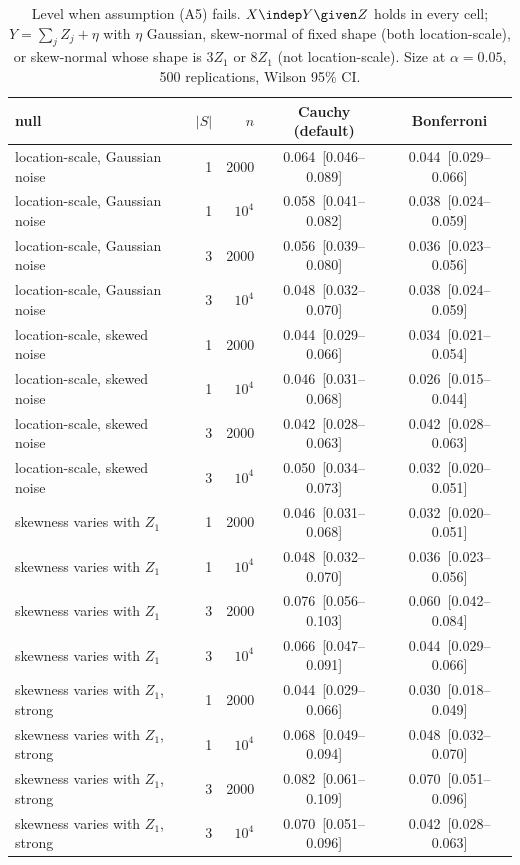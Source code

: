 \begin{table}[t]\centering\small
\begin{tabular}{lrrcc}
\toprule
null & $|S|$ & $n$ & Cauchy (default) & Bonferroni \\
\midrule
location-scale, Gaussian noise & 1 & 2000 & 0.064~[0.046--0.089] & 0.044~[0.029--0.066] \\
location-scale, Gaussian noise & 1 & $10^4$ & 0.058~[0.041--0.082] & 0.038~[0.024--0.059] \\
location-scale, Gaussian noise & 3 & 2000 & 0.056~[0.039--0.080] & 0.036~[0.023--0.056] \\
location-scale, Gaussian noise & 3 & $10^4$ & 0.048~[0.032--0.070] & 0.038~[0.024--0.059] \\
location-scale, skewed noise & 1 & 2000 & 0.044~[0.029--0.066] & 0.034~[0.021--0.054] \\
location-scale, skewed noise & 1 & $10^4$ & 0.046~[0.031--0.068] & 0.026~[0.015--0.044] \\
location-scale, skewed noise & 3 & 2000 & 0.042~[0.028--0.063] & 0.042~[0.028--0.063] \\
location-scale, skewed noise & 3 & $10^4$ & 0.050~[0.034--0.073] & 0.032~[0.020--0.051] \\
skewness varies with $Z_1$ & 1 & 2000 & 0.046~[0.031--0.068] & 0.032~[0.020--0.051] \\
skewness varies with $Z_1$ & 1 & $10^4$ & 0.048~[0.032--0.070] & 0.036~[0.023--0.056] \\
skewness varies with $Z_1$ & 3 & 2000 & 0.076~[0.056--0.103] & 0.060~[0.042--0.084] \\
skewness varies with $Z_1$ & 3 & $10^4$ & 0.066~[0.047--0.091] & 0.044~[0.029--0.066] \\
skewness varies with $Z_1$, strong & 1 & 2000 & 0.044~[0.029--0.066] & 0.030~[0.018--0.049] \\
skewness varies with $Z_1$, strong & 1 & $10^4$ & 0.068~[0.049--0.094] & 0.048~[0.032--0.070] \\
skewness varies with $Z_1$, strong & 3 & 2000 & 0.082~[0.061--0.109] & 0.070~[0.051--0.096] \\
skewness varies with $Z_1$, strong & 3 & $10^4$ & 0.070~[0.051--0.096] & 0.042~[0.028--0.063] \\
\bottomrule
\end{tabular}
\caption{Level when assumption (A5) fails. $X\indep Y\given Z$ holds in every cell; $Y=\sum_j Z_j+\eta$ with $\eta$ Gaussian, skew-normal of fixed shape (both location-scale), or skew-normal whose shape is $3Z_1$ or $8Z_1$ (not location-scale). Size at $\alpha=0.05$, 500 replications, Wilson 95\% CI.}
\label{tab:misspec}
\end{table}
